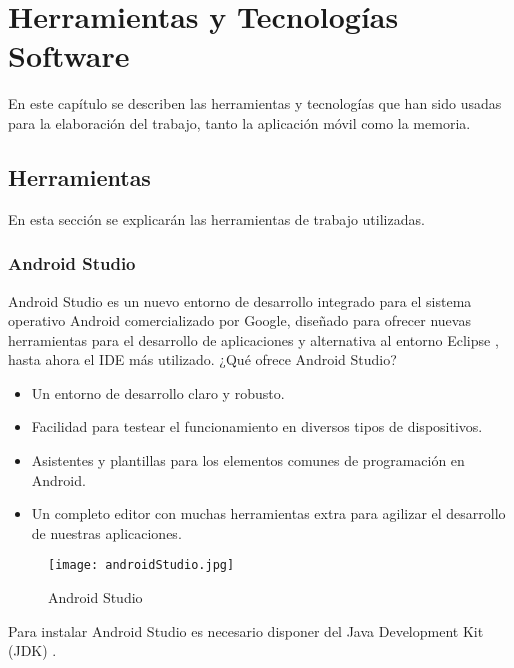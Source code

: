 %
%
%
%

\cleardoublepage
\chapter{Herramientas y Tecnologías Software} \label{chap:polytopes}  

En este capítulo se describen las herramientas y tecnologías que han sido usadas para la 
elaboración del trabajo, tanto la aplicación móvil como la memoria.

\section{Herramientas}
En esta sección se explicarán las herramientas de trabajo utilizadas.
\subsection{Android Studio}

Android Studio \cite{URL::AndroidStudio} es un nuevo entorno de desarrollo 
integrado para el sistema operativo Android comercializado por Google, 
diseñado para ofrecer nuevas herramientas para el desarrollo de aplicaciones y 
alternativa al entorno Eclipse \cite{URL::Eclipse}, 
hasta ahora el IDE más utilizado.
\newpage
¿Qué ofrece Android Studio? 
\begin{itemize}
\item Un entorno de desarrollo claro y robusto.
\item Facilidad para testear el funcionamiento en diversos tipos de dispositivos.
\item Asistentes y plantillas para los elementos comunes de programación en 
Android.
\item Un completo editor con muchas herramientas extra para agilizar el desarrollo 
de nuestras aplicaciones.
\end{itemize}

\begin{figure}[h]
	\centering
	\texttt{[image: androidStudio.jpg]}
	\caption{Android Studio}
	\label{fig:ejemplo}
\end{figure}

Para instalar Android Studio es necesario disponer del Java Development Kit 
(JDK) \cite{URL::JDKInfo}. 

